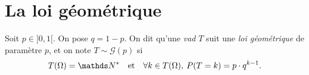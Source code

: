 \section{La loi géométrique}

\begin{defn}
  Soit $p \in {]0, 1[}$. On pose $q = 1 - p$. On dit qu'une \textit{vad} $T$ suit une \textit{loi géométrique} de paramètre $p$, et on note $T \sim \mathcal{G}(p)$ si \[
    T(\Omega) = \N^{*} \quad \text{et}\quad \forall k \in T(\Omega),\:P(T = k) = p \cdot q^{k-1}.
  \]
\end{defn}
